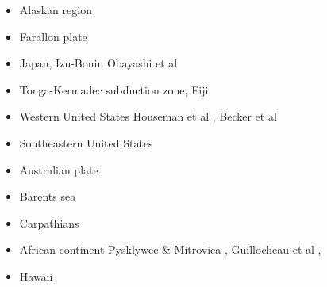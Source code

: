 \begin{itemize}
\item{Alaskan region} 
{\scriptsize
\cite{kohp10}
\cite{jabi10a}
\cite{jabi12}
\cite{jabr13}
\cite{haja17}
\cite{mimo18}
}
\item{Farallon plate} 
{\scriptsize
\cite{lisg08}
\cite{list11}
\cite{list12}
\cite{licu16}
}
\item{Japan, Izu-Bonin} 
{\scriptsize
\cite{hond85}
\cite{lohd07}
Obayashi et al \cite{obyf09}\\
\cite{vakn12}
\cite{musi13}
\cite{kigk14}\cite{leli14}\cite{mova14}\cite{hond14}
\cite{kilk15}
\cite{yagz17}
\cite{yamg19}
\cite{mapg20}
}
\item{Tonga-Kermadec subduction zone, Fiji} 
{\scriptsize
\cite{bigs03}\cite{bigu03}
\cite{zhpy06}
}
\item{Western United States}
{\scriptsize
Houseman et al \cite{honk00},
Becker et al \cite{besb06}
}
\item{Southeastern United States}
{\scriptsize
\cite{heps18}
}

\item Australian plate 
{\scriptsize
\cite{himu03}\cite{wemv03}\cite{pymi03}\cite{onml03}
\cite{onmj05}
\cite{hazs10}\cite{dimg10}
\cite{mahg11}\cite{digm11}
\cite{gosk14}
\cite{scsp15}
}
\item Barents sea 
{\scriptsize
\cite{buto07b}
\cite{gahs13}
\cite{gahs14}
}
\item Carpathians 
{\scriptsize
\cite{clbm04}
\cite{isms05}
\cite{nehe06}
\cite{sepg19}
}
\item African continent 
{\scriptsize
\cite{gikb94}
Pysklywec \& Mitrovica \cite{pymi99},
\cite{vabt11}
\cite{busm12}
\cite{gagb14}
\cite{wakc17}
Guillocheau et al \cite{gusb18},
\cite{cels20}
}
\item Hawaii 


\end{itemize}
